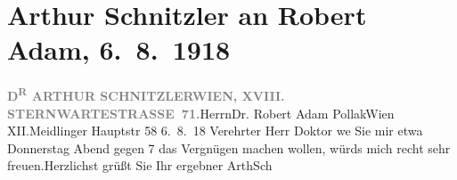 

               \section[Arthur Schnitzler an Robert Adam, 6. 8. 1918]{ Arthur Schnitzler an Robert Adam, 6. 8. 1918}\nopagebreak{}\rehead{ }\begin{ledgroupsized}[t]{13cm}\normalsize\beginnumbering{} \toendnotes[C]{\smallbreak\pagebreak[2]} 
\pstart{}{\pb}\textcolor{gray}{\textbf{D\textsuperscript{R} ARTHUR SCHNITZLER}}\pend{}\pstart{}\textcolor{gray}{\textbf{WIEN, XVIII. STERNWARTESTRASSE 71.}}\pend{}{\bigskip}\pstart{}Herrn\pend{}\pstart{}Dr. Robert Adam Pollak\pend{}\pstart{}Wien XII.\pend{}\pstart{}Meidlinger Hauptstr 58\pend{}{\bigskip}\pstart
           \raggedleft{}{\pb}6. 8. 18\pend
           \pstart{}Verehrter Herr Doktor\pend\pstart
           we{\geminationn} Sie mir etwa Donnerstag{ }Abend gegen 7 das Vergnügen machen wollen, würds mich
                    recht sehr freuen.\hspace*{1.5em}Herzlichst grüßt Sie Ihr
                    ergebner\pend
           \pstart \spacefill\mbox{ArthSch}\pend{}\endnumbering{}\end{ledgroupsized}  \newcommand{\dateiname}{L02293}\newcommand{\titel}{Arthur Schnitzler an Robert Adam, 6. 8. 1918}\newcommand{\editorInnen}{Martin Anton Müller und Gerd-Hermann Susen}
      